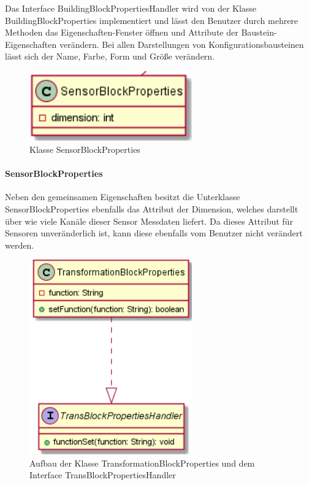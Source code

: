 \documentclass[parskip=full]{scrartcl}
\begin{document}
Das Interface BuildingBlockPropertiesHandler wird von der Klasse BuildingBlockProperties implementiert und lässt den Benutzer durch mehrere Methoden das Eigenschaften-Fenster öffnen und Attribute der Baustein-Eigenschaften verändern. Bei allen Darstellungen von Konfigurationsbausteinen lässt sich der Name, Farbe, Form und Größe verändern.

\begin{figure}[htbp]
	\begin{center}
		\includegraphics[width = 7cm]{Grafiken/View/SensorBlockProperties.png}
		\caption{Klasse SensorBlockProperties}
		\label{SensorBlockProperties}
	\end{center}
\end{figure}

\paragraph{SensorBlockProperties}

Neben den gemeinsamen Eigenschaften besitzt die Unterklasse SensorBlockProperties ebenfalls das Attribut der Dimension, welches darstellt über wie viele Kanäle dieser Sensor Messdaten liefert. Da dieses Attribut für Sensoren unveränderlich ist, kann diese ebenfalls vom Benutzer nicht verändert werden.

\begin{figure}[htbp]
	\begin{center}
		\includegraphics[width = 7cm]{Grafiken/View/TransformationBlockProperties.png}
		\caption{Aufbau der Klasse TransformationBlockProperties und dem Interface TransBlockPropertiesHandler}
		\label{Entwurf_Grob}
	\end{center}
\end{figure}
\end{document}
